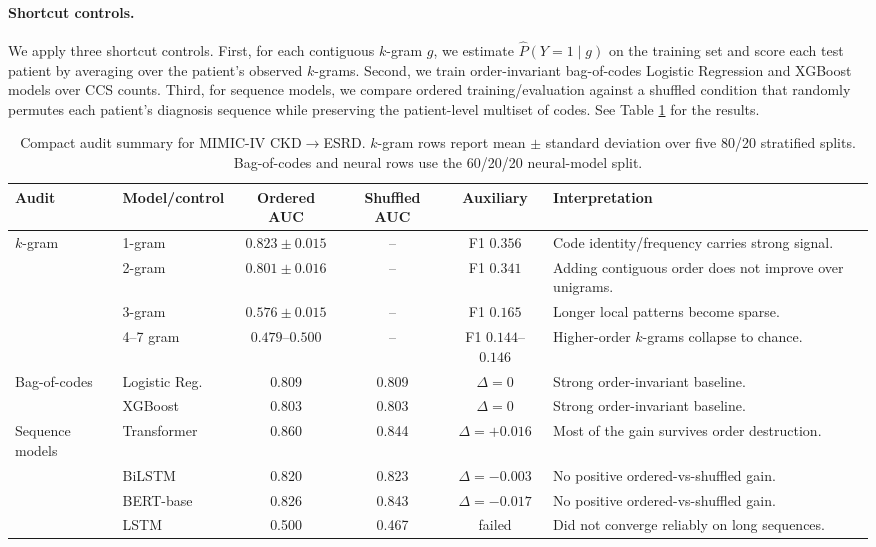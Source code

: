 \documentclass{article} %
\theoremstyle{plain}
\theoremstyle{definition}
\theoremstyle{remark}
\begin{document}
\paragraph{Shortcut controls.}
We apply three shortcut controls. First, for each contiguous $k$-gram $g$, we estimate $\hat P(Y=1\mid g)$ on the training set and score each test patient by averaging over the patient's observed $k$-grams. Second, we train order-invariant bag-of-codes Logistic Regression and XGBoost models over CCS counts. Third, for sequence models, we compare ordered training/evaluation against a shuffled condition that randomly permutes each patient's diagnosis sequence while preserving the patient-level multiset of codes. See Table \ref{tab:mimic_ckd_audit} for the results.

\begin{table}[t]
\centering
\caption{Compact audit summary for MIMIC-IV CKD$\to$ESRD. $k$-gram rows report mean $\pm$ standard deviation over five 80/20 stratified splits. Bag-of-codes and neural rows use the 60/20/20 neural-model split.}
\label{tab:mimic_ckd_audit}
\small
\setlength{\tabcolsep}{4pt}
\begin{tabularx}{\textwidth}{@{}llccc X@{}}
\toprule
Audit & Model/control & Ordered AUC & Shuffled AUC & Auxiliary & Interpretation \\
\midrule
$k$-gram & 1-gram & $0.823\pm0.015$ & -- & F1 $0.356$ & Code identity/frequency carries strong signal. \\
          & 2-gram & $0.801\pm0.016$ & -- & F1 $0.341$ & Adding contiguous order does not improve over unigrams. \\
          & 3-gram & $0.576\pm0.015$ & -- & F1 $0.165$ & Longer local patterns become sparse. \\
          & 4--7 gram & $0.479$--$0.500$ & -- & F1 $0.144$--$0.146$ & Higher-order $k$-grams collapse to chance. \\
\midrule
Bag-of-codes & Logistic Reg. & 0.809 & 0.809 & $\Delta=0$ & Strong order-invariant baseline. \\
             & XGBoost & 0.803 & 0.803 & $\Delta=0$ & Strong order-invariant baseline. \\
\midrule
Sequence models & Transformer & 0.860 & 0.844 & $\Delta=+0.016$ & Most of the gain survives order destruction. \\
                & BiLSTM & 0.820 & 0.823 & $\Delta=-0.003$ & No positive ordered-vs-shuffled gain. \\
                & BERT-base & 0.826 & 0.843 & $\Delta=-0.017$ & No positive ordered-vs-shuffled gain. \\
                & LSTM & 0.500 & 0.467 & failed & Did not converge reliably on long sequences. \\
\bottomrule
\end{tabularx}
\end{table}
\end{document}
